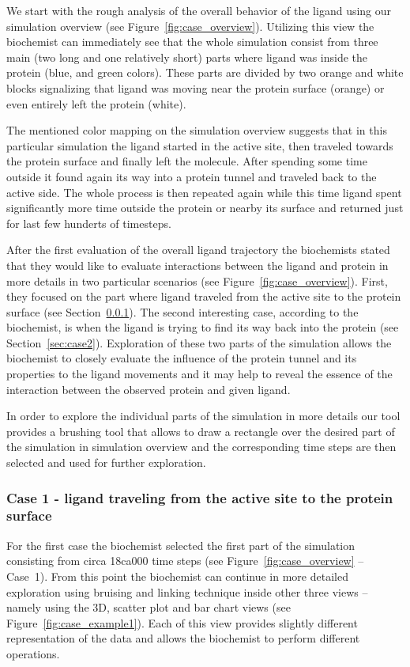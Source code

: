 \documentclass[twocolumn]{bmcart}%
\begin{document}
We start with the rough analysis of the overall behavior of the ligand using our simulation overview (see Figure~\ref{fig:case_overview}).
Utilizing this view the biochemist can immediately see that the whole simulation consist from three main (two long and one relatively short) parts where ligand was inside the protein (blue, and green colors).
These parts are divided by two orange and white blocks signalizing that ligand was moving near the protein surface (orange) or even entirely left the protein (white).
 
The mentioned color mapping on the simulation overview suggests that in this particular simulation the ligand started in the active site, then traveled towards the protein surface and finally left the molecule.
After spending some time outside it found again its way into a protein tunnel and traveled back to the active side.
The whole process is then repeated again while this time ligand spent significantly more time outside the protein or nearby its surface and returned just for last few hunderts of timesteps. 

After the first evaluation of the overall ligand trajectory the biochemists stated that they would like to evaluate interactions between the ligand and protein in more details in two particular scenarios (see Figure~\ref{fig:case_overview}). 
First, they focused on the part where ligand traveled from the active site to the protein surface (see Section~\ref{sec:case1}). 
The second interesting case, according to the biochemist, is when the ligand is trying to find its way back into the protein (see Section~\ref{sec:case2}).
Exploration of these two parts of the simulation allows the biochemist to closely evaluate the influence of the protein tunnel and its properties to the ligand movements and it may help to reveal the essence of the interaction between the observed protein and given ligand.

In order to explore the individual parts of the simulation in more details our tool provides a brushing tool that allows to draw a rectangle over the desired part of the simulation in simulation overview and the corresponding time steps are then selected and used for further exploration.



\subsubsection{Case 1 - ligand traveling from the active site to the protein surface}
\label{sec:case1}
For the first case the biochemist selected the first part of the simulation consisting from circa 18ca000 time steps (see Figure~\ref{fig:case_overview} -- Case~1). 
From this point the biochemist can continue in more detailed exploration using bruising and linking technique inside other three views -- namely using the 3D, scatter plot and bar chart views (see Figure~\ref{fig:case_example1}).
Each of this view provides slightly different representation of the data and allows the biochemist to perform different operations. 
\end{document}
